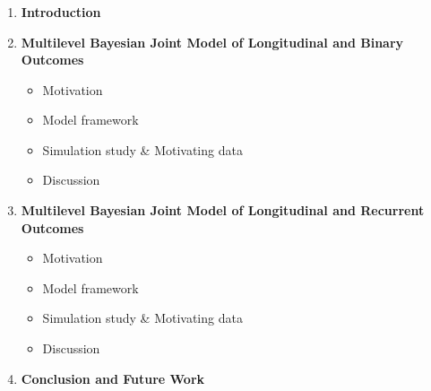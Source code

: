 \documentclass[fleqn]{beamer}
\begin{document}
\begin{frame}
\frametitle{}
\begin{enumerate}
    \item<0> \textbf{Introduction}
    \item<0> \textbf{Multilevel Bayesian Joint Model of Longitudinal and Binary Outcomes}
    \begin{itemize}
        \item Motivation
        \item Model framework
        \item Simulation study \& Motivating data
        \item Discussion
    \end{itemize}
    \item<0> \textbf{Multilevel Bayesian Joint Model of Longitudinal and Recurrent Outcomes}
    \begin{itemize}
        \item Motivation
        \item Model framework
        \item Simulation study \& Motivating data
        \item Discussion
    \end{itemize}
    \item \textbf{Conclusion and Future Work}
\end{enumerate}
\end{frame}
\end{document}
